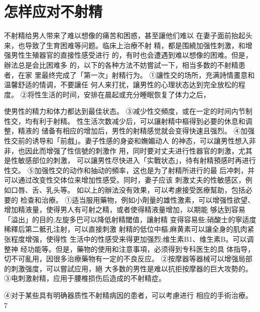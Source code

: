 \documentclass[12pt,UTF8]{ctexbook}
\begin{document}
\section{怎样应对不射精}
不射精给男人带来了难以想像的痛苦和困惑，甚至讓他们难以
在妻子面前抬起头来，也导致了生育困难等问题。临床上治療不射
精，都是围繞加强性刺激，和增强男性生殖器官的直接性感受进行
的，有时也会遭遇到难以想像的困难。但是，辦法总是会比困难多
的，以下的各种方法不妨嘗試一下，相当多数的不射精患者，在家
里最终完成了「第一次」射精行为。
①讓性交的场所，充满詩情畫意和温馨舒适的情调，不要讓任
何人来打扰，讓男性的心理状态达到完全放松的程度。
②将性生活的时间，安排在晨起或充分睡眠恢复了体力之后，

使男性的精力和体力都达到最佳状态。
③减少性交頻度，或在一定的时间内节制性交，均有利于射精。
性生活次数减少后，可以讓射精中樞得到必要的休息和调整，精液的
储备有相应的增加后，男性的射精感觉就会变得快速且强烈。
④加强性交前的诱导和「前戲」。妻子性感的身姿和嫵媚动人
的神态，可以讓男性想入非非，也因此而增强了性信號的刺激作
用，同时要对丈夫进行性器官的刺激，尤其是性敏感部位的刺激，
可以讓男性尽快进入「实戰状态」，待有射精預感时再进行性交。
⑤加强性交的动作和抽动的頻率，这也是为了射精所进行的最
后冲刺，并可以通过改变性交体位来增加性感受。同时，妻子应该
刺激丈夫的性敏感区，例如口唇、舌、乳头等。
如以上的辦法没有效果，可以考慮接受医療幫助，包括必要的
检查和治療。
①适当服用藥物，例如小劑量的雄性激素，可以增强性欲望、
增加精液量，使得男人有可射之精，或者使得精液量增加，以期能
够达到容易「溢出」的目的;左旋多巴可以降低射精閾值，讓射精
变得容易些;硝酸士的寧适度稀釋后第二骶孔注射，可以直接刺激
射精的低位中樞;麻黄素可以讓全身的肌肉紧张程度增强，使得性
生活中的性感受来得更加强烈;维生素B1、维生素B。可以调整神
经功能等。但是，藥物的使用和注意事項，必须得到专科医生的具
体指导，切不可亂用，因很多治療藥物有一定的不良反应。
②按摩器等器械可以增强局部的刺激强度，可以嘗試应用，絕
大多数的男性是难以抗拒按摩器的巨大攻勢的。
③电刺激射精，应用于腰椎损伤后造成的不射精症。

④对于某些具有明确器质性不射精病因的患者，可以考慮进行
相应的手術治療。
7
\end{document}

